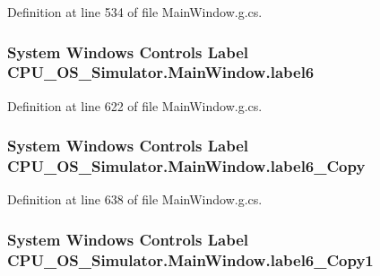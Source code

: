 Definition at line 534 of file Main\+Window.\+g.\+cs.

\hypertarget{class_c_p_u___o_s___simulator_1_1_main_window_a8f210008776bb163b4c2c2b160aa52be}{}
\subsubsection[{label6}]{\setlength{\rightskip}{0pt plus 5cm}System Windows Controls Label C\+P\+U\+\_\+\+O\+S\+\_\+\+Simulator.\+Main\+Window.\+label6\hspace{0.3cm}{\ttfamily [package]}}\label{class_c_p_u___o_s___simulator_1_1_main_window_a8f210008776bb163b4c2c2b160aa52be}


Definition at line 622 of file Main\+Window.\+g.\+cs.

\hypertarget{class_c_p_u___o_s___simulator_1_1_main_window_a18612502a8ab2d53d85434e426785022}{}
\subsubsection[{label6\+\_\+\+Copy}]{\setlength{\rightskip}{0pt plus 5cm}System Windows Controls Label C\+P\+U\+\_\+\+O\+S\+\_\+\+Simulator.\+Main\+Window.\+label6\+\_\+\+Copy\hspace{0.3cm}{\ttfamily [package]}}\label{class_c_p_u___o_s___simulator_1_1_main_window_a18612502a8ab2d53d85434e426785022}


Definition at line 638 of file Main\+Window.\+g.\+cs.

\hypertarget{class_c_p_u___o_s___simulator_1_1_main_window_a890bd54d36af19ec881b6a840d6ac8a9}{}
\subsubsection[{label6\+\_\+\+Copy1}]{\setlength{\rightskip}{0pt plus 5cm}System Windows Controls Label C\+P\+U\+\_\+\+O\+S\+\_\+\+Simulator.\+Main\+Window.\+label6\+\_\+\+Copy1\hspace{0.3cm}{\ttfamily [package]}}\label{class_c_p_u___o_s___simulator_1_1_main_window_a890bd54d36af19ec881b6a840d6ac8a9}


